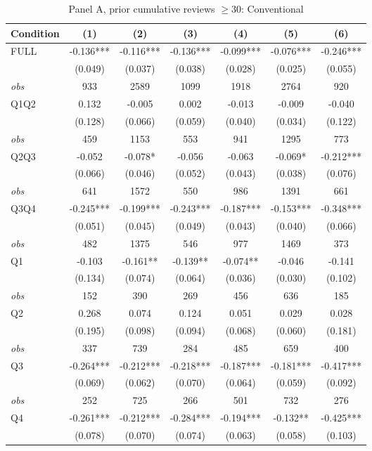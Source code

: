 \begin{table}[!htbp]
\centering
\caption{Panel A, prior cumulative reviews $\geq30$: Conventional}
\begin{tabular}{lcccccc}
\toprule
Condition & (1) & (2) & (3) & (4) & (5) & (6) \\
\midrule
FULL & -0.136*** & -0.116*** & -0.136*** & -0.099*** & -0.076*** & -0.246*** \\
 & (0.049) & (0.037) & (0.038) & (0.028) & (0.025) & (0.055) \\
\textit{obs} & 933 & 2589 & 1099 & 1918 & 2764 & 920 \\
Q1Q2 & 0.132 & -0.005 & 0.002 & -0.013 & -0.009 & -0.040 \\
 & (0.128) & (0.066) & (0.059) & (0.040) & (0.034) & (0.122) \\
\textit{obs} & 459 & 1153 & 553 & 941 & 1295 & 773 \\
Q2Q3 & -0.052 & -0.078* & -0.056 & -0.063 & -0.069* & -0.212*** \\
 & (0.066) & (0.046) & (0.052) & (0.043) & (0.038) & (0.076) \\
\textit{obs} & 641 & 1572 & 550 & 986 & 1391 & 661 \\
Q3Q4 & -0.245*** & -0.199*** & -0.243*** & -0.187*** & -0.153*** & -0.348*** \\
 & (0.051) & (0.045) & (0.049) & (0.043) & (0.040) & (0.066) \\
\textit{obs} & 482 & 1375 & 546 & 977 & 1469 & 373 \\
Q1 & -0.103 & -0.161** & -0.139** & -0.074** & -0.046 & -0.141 \\
 & (0.134) & (0.074) & (0.064) & (0.036) & (0.030) & (0.102) \\
\textit{obs} & 152 & 390 & 269 & 456 & 636 & 185 \\
Q2 & 0.268 & 0.074 & 0.124 & 0.051 & 0.029 & 0.028 \\
 & (0.195) & (0.098) & (0.094) & (0.068) & (0.060) & (0.181) \\
\textit{obs} & 337 & 739 & 284 & 485 & 659 & 400 \\
Q3 & -0.264*** & -0.212*** & -0.218*** & -0.187*** & -0.181*** & -0.417*** \\
 & (0.069) & (0.062) & (0.070) & (0.064) & (0.059) & (0.092) \\
\textit{obs} & 252 & 725 & 266 & 501 & 732 & 276 \\
Q4 & -0.261*** & -0.212*** & -0.284*** & -0.194*** & -0.132** & -0.425*** \\
 & (0.078) & (0.070) & (0.074) & (0.063) & (0.058) & (0.103) \\

\end{tabular}
\end{table}
